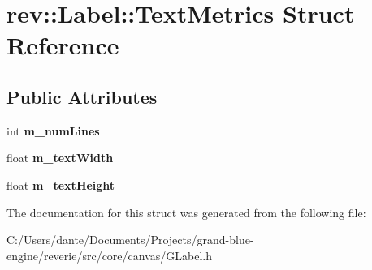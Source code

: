 \hypertarget{structrev_1_1_label_1_1_text_metrics}{}\section{rev\+::Label\+::Text\+Metrics Struct Reference}
\label{structrev_1_1_label_1_1_text_metrics}
\subsection*{Public Attributes}
\begin{DoxyCompactItemize}
\item 
\mbox{\label{structrev_1_1_label_1_1_text_metrics_ae0b53deba709e5ad4327df15017bc41a}} 
int {\bfseries m\+\_\+num\+Lines}
\item 
\mbox{\label{structrev_1_1_label_1_1_text_metrics_ac219bd690fd37ae5804f56f3eaa27279}} 
float {\bfseries m\+\_\+text\+Width}
\item 
\mbox{\label{structrev_1_1_label_1_1_text_metrics_a3f2b3b92dd4b404cfe2f211df1e6f153}} 
float {\bfseries m\+\_\+text\+Height}
\end{DoxyCompactItemize}


The documentation for this struct was generated from the following file\+:\begin{DoxyCompactItemize}
\item 
C\+:/\+Users/dante/\+Documents/\+Projects/grand-\/blue-\/engine/reverie/src/core/canvas/G\+Label.\+h\end{DoxyCompactItemize}
